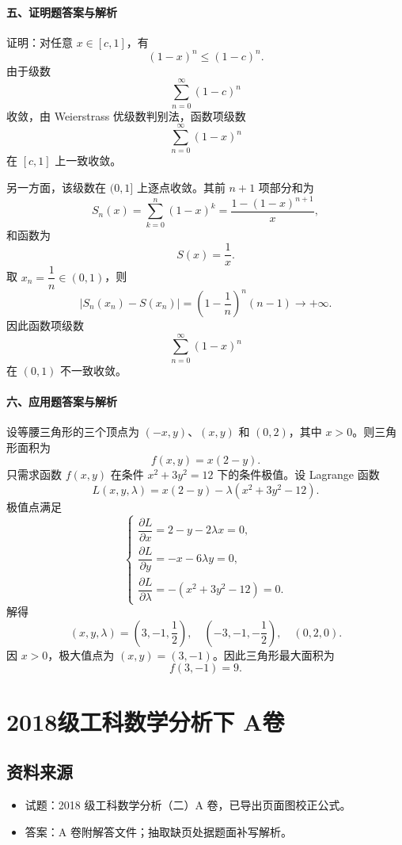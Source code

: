\paragraph*{五、证明题答案与解析}
证明：对任意 $x\in[c,1]$，有
\[
  (1-x)^n\le (1-c)^n.
\]
由于级数
\[
  \sum_{n=0}^{\infty}(1-c)^n
\]
收敛，由 Weierstrass 优级数判别法，函数项级数
\[
  \sum_{n=0}^{\infty}(1-x)^n
\]
在 $[c,1]$ 上一致收敛。

另一方面，该级数在 $(0,1]$ 上逐点收敛。其前 $n+1$ 项部分和为
\[
  S_n(x)=\sum_{k=0}^{n}(1-x)^k
  =\frac{1-(1-x)^{n+1}}{x},
\]
和函数为
\[
  S(x)=\frac1x.
\]
取 $x_n=\dfrac1n\in(0,1)$，则
\[
  \left|S_n(x_n)-S(x_n)\right|
  =\left(1-\frac1n\right)^n(n-1)\to+\infty.
\]
因此函数项级数
\[
  \sum_{n=0}^{\infty}(1-x)^n
\]
在 $(0,1)$ 不一致收敛。

\paragraph*{六、应用题答案与解析}
设等腰三角形的三个顶点为 $(-x,y)$、$(x,y)$ 和 $(0,2)$，其中 $x>0$。则三角形面积为
\[
  f(x,y)=x(2-y).
\]
只需求函数 $f(x,y)$ 在条件 $x^2+3y^2=12$ 下的条件极值。设 Lagrange 函数
\[
  L(x,y,\lambda)=x(2-y)-\lambda(x^2+3y^2-12).
\]
极值点满足
\[
  \begin{cases}
    \dfrac{\partial L}{\partial x}=2-y-2\lambda x=0,\\
    \dfrac{\partial L}{\partial y}=-x-6\lambda y=0,\\
    \dfrac{\partial L}{\partial \lambda}=-(x^2+3y^2-12)=0.
  \end{cases}
\]
解得
\[
  (x,y,\lambda)=\left(3,-1,\frac12\right),\quad
  \left(-3,-1,-\frac12\right),\quad
  (0,2,0).
\]
因 $x>0$，极大值点为 $(x,y)=(3,-1)$。因此三角形最大面积为
\[
  f(3,-1)=9.
\]

\section{2018级工科数学分析下 A卷}

\subsection{资料来源}
\begin{itemize}
  \item 试题：2018 级工科数学分析（二）A 卷，已导出页面图校正公式。
  \item 答案：A 卷附解答文件；抽取缺页处据题面补写解析。
\end{itemize}

